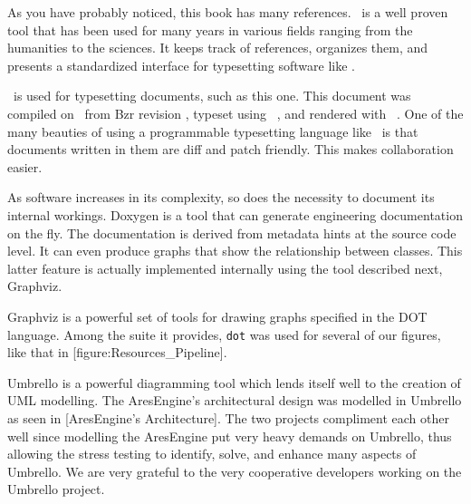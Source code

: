 

\startitemize[4]
\head {\em \BIBTEX}

As you have probably noticed, this book has many references. \BIBTEX\ is a well proven tool that has been used for many years in various fields ranging from the humanities to the sciences. It keeps track of references, organizes them, and presents a standardized interface for typesetting software like \CONTEXT.

\head {\em \CONTEXT}

\CONTEXT\ is used for typesetting documents, such as this one. This document was compiled on \currentdate\ from Bzr revision \BzrRevisionClickable, typeset using \CONTEXT\ \contextversion, and rendered with \texenginename\ \texengineversion. One of the many beauties of using a programmable typesetting language like \CONTEXT\ is that documents written in them are diff and patch friendly. This makes collaboration easier.


As software increases in its complexity, so does the necessity to document its internal workings. Doxygen is a tool that can generate engineering documentation on the fly. The documentation is derived from metadata hints at the source code level. It can even produce graphs that show the relationship between classes. This latter feature is actually implemented internally using the tool described next, Graphviz.


Graphviz is a powerful set of tools for drawing graphs specified in the DOT language. Among the suite it provides, {\tt dot} was used for several of our figures, like that in [figure:Resources_Pipeline].


Umbrello is a powerful diagramming tool which lends itself well to the creation of UML modelling. The AresEngine's architectural design was modelled in Umbrello as seen in [AresEngine's Architecture]. The two projects compliment each other well since modelling the AresEngine put very heavy demands on Umbrello, thus allowing the stress testing to identify, solve, and enhance many aspects of Umbrello. We are very grateful to the very cooperative developers working on the Umbrello project.
\stopitemize

